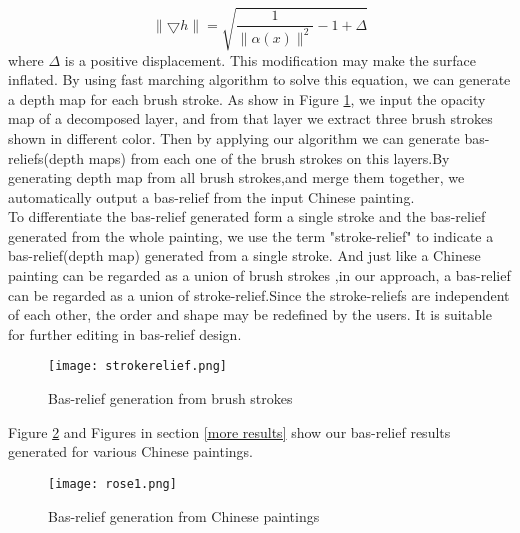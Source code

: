 \begin{equation}
\lVert \bigtriangledown h \rVert = \sqrt{\frac{1}{\lVert \alpha(x) \rVert ^2}-1+ \Delta}
\end{equation}
where $\Delta$ is a positive displacement. This modification may make the surface inflated. By using fast marching algorithm \cite{sethian1999level} to solve this equation, we can generate a depth map for each brush stroke. As show in Figure \ref{strokerelief}, we input the opacity map of a decomposed layer, and from that layer we extract three brush strokes shown in different color. Then by applying our algorithm we can generate bas-reliefs(depth maps) from each one of the brush strokes on this layers.By generating depth map from all brush strokes,and merge them together, we automatically output a bas-relief from the input Chinese painting. \\
To differentiate the bas-relief generated form a single stroke and the bas-relief generated from the whole painting, we use the term "stroke-relief" to indicate a bas-relief(depth map) generated from a single stroke. And just like a Chinese painting can be regarded as a union of brush strokes \cite{xu2006animating} ,in our approach, a bas-relief can be regarded as a union of stroke-relief.Since the stroke-reliefs are independent of each other, the order and shape may be redefined by the users. It is suitable for further editing in bas-relief design.
\begin{figure}[H]
	\centering
	\texttt{[image: strokerelief.png]}
	\caption{Bas-relief generation from brush strokes}
	\label{strokerelief}
\end{figure}

Figure \ref{ch_pre} and Figures in section \ref{more results} show our bas-relief results generated for various Chinese paintings. 

\begin{figure}[H]
	\centering
	\texttt{[image: rose1.png]}
	\caption{Bas-relief generation from Chinese paintings}
	\label{ch_pre}
\end{figure}

